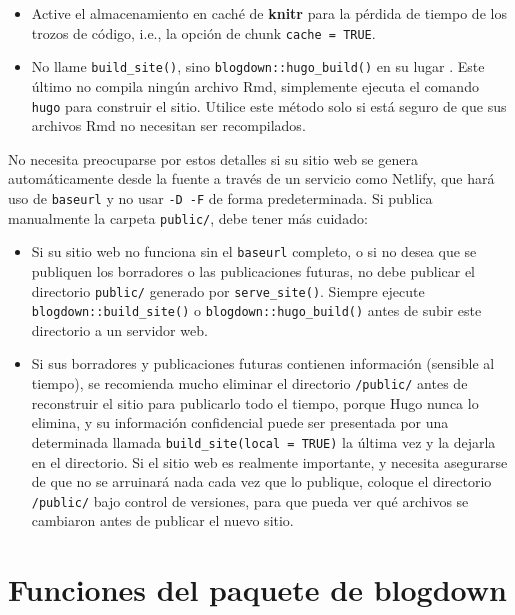 \documentclass[12pt,]{krantz}
\theoremstyle{definition}
\theoremstyle{definition}
\theoremstyle{definition}
\theoremstyle{remark}
\begin{document}
\begin{itemize}
  \begin{itemize}
  \item
    Active el almacenamiento en caché de \textbf{knitr} para la pérdida
    de tiempo de los trozos de código, i.e., la opción de chunk
    \texttt{cache\ =\ TRUE}.
  \item
    No llame \texttt{build\_site()}, sino
    \texttt{blogdown::hugo\_build()} en su lugar
    . Este último no compila ningún
    archivo Rmd, simplemente ejecuta el comando \texttt{hugo} para
    construir el sitio. Utilice este método solo si está seguro de que
    sus archivos Rmd no necesitan ser recompilados.
  \end{itemize}
\end{itemize}

No necesita preocuparse por estos detalles si su sitio web se genera
automáticamente desde la fuente a través de un servicio como Netlify,
que hará uso de \texttt{baseurl} y no usar \texttt{-D\ -F} de forma
predeterminada. Si publica manualmente la carpeta \texttt{public/}, debe
tener más cuidado:

\begin{itemize}
\item
  Si su sitio web no funciona sin el \texttt{baseurl} completo, o si no
  desea que se publiquen los borradores o las publicaciones futuras, no
  debe publicar el directorio \texttt{public/} generado por
  \texttt{serve\_site()}. Siempre ejecute
  \texttt{blogdown::build\_site()} o \texttt{blogdown::hugo\_build()}
  antes de subir este directorio a un servidor web.
\item
  Si sus borradores y publicaciones futuras contienen información
  (sensible al tiempo), se recomienda mucho eliminar el directorio
  \texttt{/public/} antes de reconstruir el sitio para publicarlo todo
  el tiempo, porque Hugo nunca lo elimina, y su información confidencial
  puede ser presentada por una determinada llamada
  \texttt{build\_site(local\ =\ TRUE)} la última vez y la dejarla en el
  directorio. Si el sitio web es realmente importante, y necesita
  asegurarse de que no se arruinará nada cada vez que lo publique,
  coloque el directorio \texttt{/public/} bajo control de versiones,
  para que pueda ver qué archivos se cambiaron antes de publicar el
  nuevo sitio.
\end{itemize}

\hypertarget{funciones}{%
\section{Funciones del paquete de blogdown}\label{funciones}}
\end{document}
